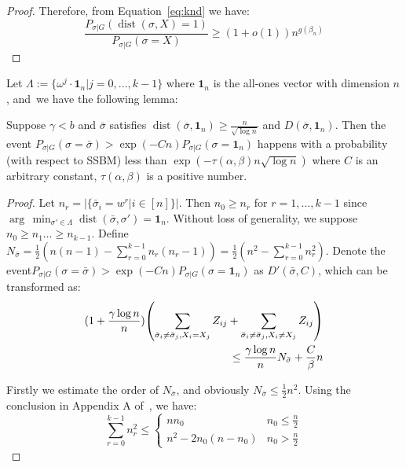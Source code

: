 \documentclass[entropy,article,accept,moreauthors,pdftex]{Definitions/mdpi}
\newcommand{\1}{\mathbbm{1}}
\DeclareMathOperator{\Dist}{dist}
\begin{document}
\begin{paracol}{2}
\begin{proof}
Therefore, from Equation~\eqref{eq:knd} we have:
\begin{equation*}
	\frac{P_{\sigma|G}(\Dist(\sigma, X)=1)}
{P_{\sigma|G}(\sigma=X)} \geq (1+o(1)) n^{g(\beta_n)}
\end{equation*}
\end{proof}

Let $\Lambda := \{ \omega^j  \cdot \mathbf{1}_n | j=0, \dots,k-1\}$
where $\mathbf{1}_n$ is the all-ones vector %
 with dimension $n$, and~we have the following lemma:
\begin{Lemma}\label{lem:small}
	Suppose $\gamma < b $ and $\bar{\sigma}$ satisfies $\Dist(\bar{\sigma}, \mathbf{1}_n) \geq \frac{n}{\sqrt{\log  n}}$
	and $D(\bar{\sigma}, \mathbf{1}_n)$.
	Then the event
	$P_{\sigma | G}(\sigma = \bar{\sigma} ) > \exp(-Cn) P_{\sigma | G}(\sigma = \mathbf{1}_n)$
	happens with a probability (with respect to SSBM) less than $\exp(-\tau(\alpha,\beta) n \sqrt{\log  n} )$ where $C$ is an arbitrary constant, $\tau(\alpha,\beta)$ is a positive number.
\end{Lemma}
\begin{proof}
	Let $n_r = |\{\bar{\sigma}_i = w^r | i\in [n] \}|$. Then $n_0 \geq n_r$ for $r=1, \dots, k-1$ since\linebreak $\arg\,\min_{\sigma'\in \Lambda} \Dist(\bar{\sigma}, \sigma') = \mathbf{1}_n$.
	Without loss of generality,
	we suppose \mbox{$n_0 \geq n_1 \dots \geq n_{k-1}$}.
	Define $N_{\bar{\sigma}} = \frac{1}{2}(n(n-1) - \sum_{r=0}^{k-1} n_r(n_r-1))
	=\frac{1}{2}(n^2 - \sum_{r=0}^{k-1} n_r^2)$.
	Denote the event\linebreak $P_{\sigma | G}(\sigma = \bar{\sigma} ) > \exp(-Cn) P_{\sigma | G}(\sigma = \mathbf{1}_n)$ as $D'(\bar{\sigma}, C)$,
	which can be transformed as:
\begin{align}
	(1 + \frac{\gamma \log n}{n})
	\left( \sum_{\bar{\sigma}_i  \neq \bar{\sigma}_j, X_i = X_j} Z_{ij} +
	\sum_{\bar{\sigma}_i  \neq \bar{\sigma}_j, X_i \neq X_j} Z_{ij} \right)\notag\\
	\leq \frac{\gamma \log n}{n} N_{\bar{\sigma}} + \frac{C}{\beta} n\label{eq:small}
	\end{align}
		
	Firstly we estimate the order of $N_{\bar{\sigma}}$, and obviously $N_{\bar{\sigma}} \leq \frac{1}{2} n^2$.
	Using the conclusion in Appendix A of~\cite{chen2016information}, we have:
\begin{equation}
	\sum_{r=0}^{k-1} n_r^2 \leq
	\begin{cases}
	n n_0 & n_0 \leq \frac{n}{2} \\
	n^2 - 2n_0(n-n_0) & n_0 > \frac{n}{2}
	\end{cases}
	\end{equation}
	

\end{proof}
\end{paracol}
\end{document}
